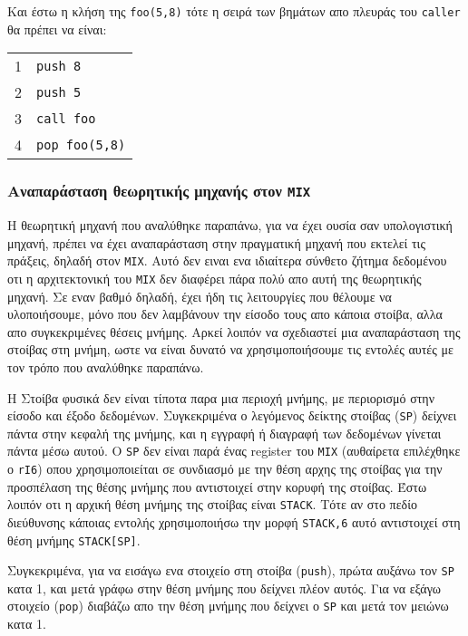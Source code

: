 \documentclass[a4paper,11pt]{article}
\newcommand{\eng}[1]{\foreignlanguage{english}{#1}}
\newcommand{\tech}[1]{\foreignlanguage{english}{\texttt{#1}}}
\begin{document}
Και έστω η κλήση της \tech{foo(5,8)} τότε η σειρά των βημάτων απο πλευράς του \tech{caller}
θα πρέπει να είναι:

\begin{center}
	\begin{tabular}{r|l|}
		1 & \tech{push 8} \\
		2 & \tech{push 5} \\
		3 & \tech{call foo} \\
		4 & \tech{pop foo(5,8)}
	\end{tabular}
\end{center}

\subsubsection{Αναπαράσταση θεωρητικής μηχανής στον \tech{MIX}}
Η θεωρητική μηχανή που αναλύθηκε παραπάνω, για να έχει ουσία σαν υπολογιστική μηχανή,
πρέπει να έχει αναπαράσταση στην πραγματική μηχανή που εκτελεί τις πράξεις,
δηλαδή στον \tech{MIX}. Αυτό δεν ειναι ενα ιδιαίτερα σύνθετο ζήτημα δεδομένου οτι η 
αρχιτεκτονική του \tech{MIX} δεν διαφέρει πάρα πολύ απο αυτή της θεωρητικής μηχανή.
Σε εναν βαθμό δηλαδή, έχει ήδη τις λειτουργίες που θέλουμε να υλοποιήσουμε, μόνο
που δεν λαμβάνουν την είσοδο τους απο κάποια στοίβα, αλλα απο συγκεκριμένες θέσεις μνήμης. 
Αρκεί λοιπόν να σχεδιαστεί μια αναπαράσταση της στοίβας στη μνήμη, ωστε να είναι δυνατό
να χρησιμοποιήσουμε τις εντολές αυτές με τον τρόπο που αναλύθηκε παραπάνω.

Η Στοίβα φυσικά δεν είναι τίποτα παρα μια περιοχή μνήμης, με περιορισμό στην είσοδο και
έξοδο δεδομένων. Συγκεκριμένα ο λεγόμενος δείκτης στοίβας (\tech{SP}) δείχνει πάντα στην
κεφαλή της μνήμης, και η εγγραφή ή διαγραφή των δεδομένων γίνεται πάντα μέσω αυτού.
Ο \tech{SP} δεν είναι παρά ένας \eng{register} του \tech{MIX} (αυθαίρετα επιλέχθηκε ο 
\tech{rI6}) οπου χρησιμοποιείται σε συνδιασμό με την θέση αρχης της στοίβας για την
προσπέλαση της θέσης μνήμης που αντιστοιχεί στην κορυφή της στοίβας. Έστω λοιπόν οτι 
η αρχική θέση μνήμης της στοίβας είναι \tech{STACK}. Τότε αν στο πεδίο διεύθυνσης κάποιας
εντολής χρησιμοποιήσω την μορφή \tech{STACK,6} αυτό αντιστοιχεί στη θέση μνήμης \tech{STACK[SP]}.

Συγκεκριμένα, για να εισάγω ενα στοιχείο στη στοίβα (\tech{push}), πρώτα αυξάνω τον \tech{SP}
κατα 1, και μετά γράφω στην θέση μνήμης που δείχνει πλέον αυτός. Για να εξάγω στοιχείο
(\tech{pop}) διαβάζω απο την θέση μνήμης που δείχνει ο \tech{SP} και μετά τον μειώνω κατα 1.
\end{document}

